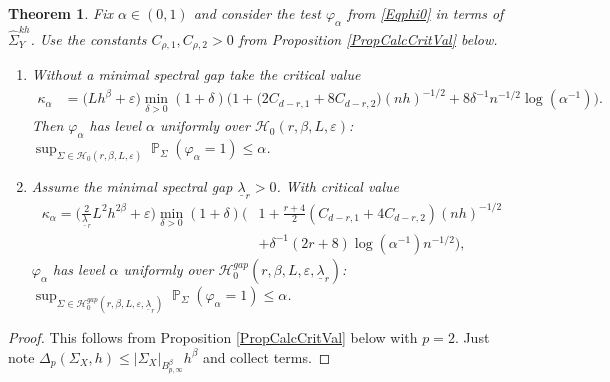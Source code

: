 \documentclass[preprint,aos]{imsart}
\numberwithin{equation}{section}
\newtheorem{theorem}[satz]{Theorem}
\theoremstyle{remark}
\DeclareMathOperator{\PP}{{\mathbb P}}
\providecommand{\eps}{\varepsilon}
\renewcommand{\phi}{\varphi}
\providecommand{\abs}[1]{\lvert #1 \rvert}
\renewcommand{\le}{\leqslant}
\providecommand{\mr}{\color{blue}}
\begin{document}
\begin{theorem}\label{ThmNoNoise}
Fix $\alpha\in(0,1)$ and consider the test $\phi_\alpha$ from \eqref{Eqphi0} in terms of $\hat\Sigma_Y^{kh}$. Use the constants $C_{\rho,1},C_{\rho,2}>0$ from Proposition \ref{PropCalcCritVal} below.
\begin{enumerate}
\item Without a minimal spectral gap   take the critical value
\begin{align*}
\kappa_\alpha&= \big(Lh^\beta+\eps\big) \min_{\delta>0}(1+\delta)\Big( 1
  +\big(2C_{d-r,1}+8C_{d-r,2}\big)(nh)^{-1/2}+
 8\delta^{-1}n^{-1/2}\log(\alpha^{-1})\Big).
\end{align*}
Then $\phi_\alpha$ has level $\alpha$ uniformly over ${\mathcal H}_0(r,\beta,L,\eps)$:
$\sup_{\Sigma\in {\mathcal H}_0(r,\beta,L,\eps)}\PP_\Sigma(\phi_\alpha=1)\le \alpha$.

\item Assume the minimal spectral gap $\underline\lambda_r>0$. With critical value
\begin{align*}
\kappa_\alpha
 = \Big(\tfrac{2}{\underline\lambda_r}L^2h^{2\beta}+\eps\Big)\min_{\delta>0}(1+\delta)\Big(& 1+\tfrac{r+4}{2}
  (C_{d-r,1}+4C_{d-r,2}) (nh)^{-1/2}\\
&+ \delta^{-1} (2r+8) \log(\alpha^{-1})n^{-1/2}\Big),
\end{align*}
$\phi_\alpha$ has level $\alpha$ uniformly over ${\mathcal H}_0^{gap}(r,\beta,L,\eps,\underline\lambda_r)$:
$\sup_{\Sigma\in {\mathcal H}_0^{gap}(r,\beta,L,\eps,\underline\lambda_{r})}\PP_\Sigma(\phi_\alpha=1)\le \alpha$.

\end{enumerate}
\end{theorem}

\begin{proof}
This follows from Proposition \ref{PropCalcCritVal} below with $p=2$. Just note $\Delta_p(\Sigma_X,h)\le \abs{\Sigma_X}_{B^\beta_{p,\infty}}h^\beta$  and collect terms.
\end{proof}
\end{document}
